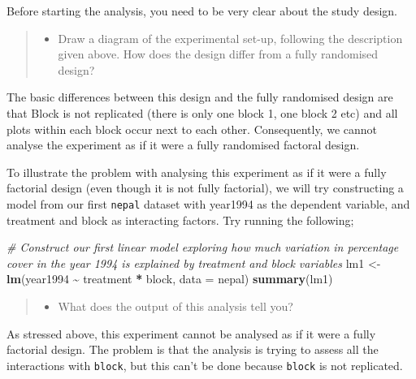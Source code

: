 \documentclass[
]{book}
\newenvironment{Shaded}{\begin{snugshade}}{\end{snugshade}}
\newcommand{\AttributeTok}[1]{\textcolor[rgb]{0.13,0.29,0.53}{#1}}
\newcommand{\CommentTok}[1]{\textcolor[rgb]{0.56,0.35,0.01}{\textit{#1}}}
\newcommand{\FunctionTok}[1]{\textcolor[rgb]{0.13,0.29,0.53}{\textbf{#1}}}
\newcommand{\NormalTok}[1]{#1}
\newcommand{\OtherTok}[1]{\textcolor[rgb]{0.56,0.35,0.01}{#1}}
\newcommand{\SpecialCharTok}[1]{\textcolor[rgb]{0.81,0.36,0.00}{\textbf{#1}}}
\providecommand{\tightlist}{%
  \setlength{\itemsep}{0pt}\setlength{\parskip}{0pt}}
\begin{document}
Before starting the analysis, you need to be very clear about the study design.

\begin{quote}
\begin{itemize}
\tightlist
\item
  Draw a diagram of the experimental set-up, following the description given above. How does the design differ from a fully randomised design?
\end{itemize}
\end{quote}

The basic differences between this design and the fully randomised design are that Block is not replicated (there is only one block 1, one block 2 etc) and all plots within each block occur next to each other. Consequently, we cannot analyse the experiment as if it were a fully randomised factoral design.

To illustrate the problem with analysing this experiment as if it were a fully factorial design (even though it is not fully factorial), we will try constructing a model from our first \texttt{nepal} dataset with year1994 as the dependent variable, and treatment and block as interacting factors. Try running the following;

\begin{Shaded}
\begin{Highlighting}[]
\CommentTok{\# Construct our first linear model exploring how much variation in percentage cover in the year 1994 is explained by treatment and block variables}
\NormalTok{lm1 }\OtherTok{\textless{}{-}} \FunctionTok{lm}\NormalTok{(year1994 }\SpecialCharTok{\textasciitilde{}}\NormalTok{ treatment }\SpecialCharTok{*}\NormalTok{ block, }\AttributeTok{data =}\NormalTok{ nepal)}
\FunctionTok{summary}\NormalTok{(lm1)}
\end{Highlighting}
\end{Shaded}

\begin{quote}
\begin{itemize}
\tightlist
\item
  What does the output of this analysis tell you?
\end{itemize}
\end{quote}

As stressed above, this experiment cannot be analysed as if it were a fully factorial design. The problem is that the analysis is trying to assess all the interactions with \texttt{block}, but this can't be done because \texttt{block} is not replicated.
\end{document}
